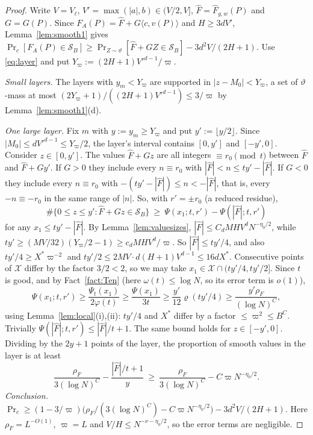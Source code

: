\documentclass[11pt]{amsart}
\theoremstyle{definition}
\newcommand{\cS}{\mathcal{S}}
\newcommand{\cX}{\mathcal{X}}
\newcommand{\XF}{X^{*}}
\newcommand{\rF}{\rho_F}
\newcommand{\Prob}{\Pr}
\begin{document}
\begin{proof}
Write $V=V_\ell$, $V'=\max(|a|,b)\in(V/2,V]$, $\hat F=\hat F_{g,w}(P)$ and $G=G(P)$. Since $F_A(P)=\hat F+G\langle c,v(P)\rangle$ and
$H\ge3dV'$, Lemma~\ref{lem:smooth1} gives
$\Prob_c[F_A(P)\in\cS_B]\ge\Prob_{Z\sim\vartheta}[\hat F+GZ\in\cS_B]-3d^2V/(2H+1)$. Use \eqref{eq:layer} and put
$Y_\varpi:=(2H+1)V'^{d-1}/\varpi$.

\emph{Small layers.} The layers with $y_m<Y_\varpi$ are supported in $|z-M_0|<Y_\varpi$, a set of $\vartheta$-mass at most
$(2Y_\varpi+1)/((2H+1)V'^{d-1})\le3/\varpi$ by Lemma~\ref{lem:smooth1}(d).

\emph{One large layer.} Fix $m$ with $y:=y_m\ge Y_\varpi$ and put $y':=\lfloor y/2\rfloor$. Since $|M_0|\le dV'^{d-1}\le Y_\varpi/2$, the
layer's interval contains $[0,y']$ and $[-y',0]$. Consider $z\in[0,y']$. The values $\hat F+Gz$ are all integers $\equiv
r_0\pmod t$ between $\hat F$ and $\hat F+Gy'$. If $G>0$ they include every $n\equiv r_0$ with $|\hat F|<n\le ty'-|\hat F|$. If $G<0$
they include every $n\equiv r_0$ with $-(ty'-|\hat F|)\le n<-|\hat F|$, that is, every $-n\equiv-r_0$ in the same range of $|n|$. So,
with $r'=\pm r_0$ (a reduced residue),
\[
\#\{0\le z\le y':\hat F+Gz\in\cS_B\}\ \ge\ \Psi(x_1;t,r')-\Psi(|\hat F|;t,r')
\]
for any $x_1\le ty'-|\hat F|$. By Lemma~\ref{lem:valuesizes}, $|\hat F|\le C_dMHV^dN^{-\eta_0/2}$, while
$ty'\ge(MV/32)(Y_\varpi/2-1)\ge c_dMHV^d/\varpi$. So $|\hat F|\le ty'/4$, and also $ty'/4\ge\XF\varpi^{-2}$ and
$ty'/2\le2MV\cdot d(H+1)V^{d-1}\le16d\XF$. Consecutive points of $\cX$ differ by the factor $3/2<2$, so we may take
$x_1\in\cX\cap(ty'/4,ty'/2]$. Since $t$ is good, and by Fact~\ref{fact:Ten} (here $\omega(t)\le\log N$, so its error
term is $o(1)$),
\[
\Psi(x_1;t,r')\ge\frac{\Psi_t(x_1)}{2\varphi(t)}\ge\frac{\Psi(x_1)}{3t}\ge\frac{y'}{12}\varrho(ty'/4)\ge\frac{y'\rF}{(\log N)^{C}},
\]
using Lemma~\ref{lem:local}(i),(ii): $ty'/4$ and $\XF$ differ by a factor $\le\varpi^2\le B^{C}$. Trivially
$\Psi(|\hat F|;t,r')\le|\hat F|/t+1$. The same bound holds for $z\in[-y',0]$. Dividing by the $2y+1$ points of the layer,
the proportion of smooth values in the layer is at least
\[
\frac{\rF}{3(\log N)^C}-\frac{|\hat F|/t+1}{y}\ \ge\ \frac{\rF}{3(\log N)^C}-C\varpi N^{-\eta_0/2}.
\]
\emph{Conclusion.} $\Prob_c\ge(1-3/\varpi)\bigl(\rF/(3(\log N)^C)-C\varpi N^{-\eta_0/2}\bigr)-3d^2V/(2H+1)$. Here $\rF=L^{-O(1)}$,
$\varpi=L$ and $V/H\le N^{-\nu-\eta_0/2}$, so the error terms are negligible.
\end{proof}
\end{document}
